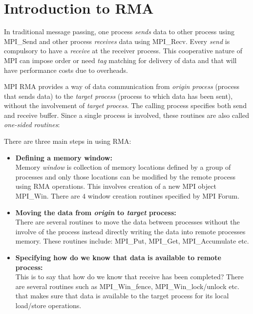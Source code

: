 \section{Introduction to RMA}
In traditional message passing, one process \textit{sends} data to other process using {\ttfamily MPI\_Send} and other 
process \textit{receives} data using {\ttfamily MPI\_Recv}. Every \textit{send} is compulsory to have a \textit{receive}
at the receiver process. This cooperative nature of MPI can impose order or need \textit{tag} matching for delivery of data
and that will have performance costs due to overheads.

MPI RMA provides a way of data communication from \textit{origin process} (process that sends data) to the \textit{target
process} (process to which data has been sent), without the involvement of \textit{target process}. The calling process specifies
both send and receive buffer. Since a single process is involved, these routines are also called \textit{one-sided routines}:

There are three main steps in using RMA:
\begin{itemize}
    \item \textbf{Defining a memory window:}\\
    Memory \textit{window} is collection of memory locations defined by a group of processes and only those locations can be
    modified by the remote process using RMA operations. This involves creation of a new MPI object {\ttfamily MPI\_Win}. There
    are $4$ window creation routines specified by MPI Forum.
    \item \textbf{Moving the data from \textit{origin} to \textit{target} process:}\\
    There are several routines to move the data between processes without the involve of the process instead directly writing the
    data into remote processes memory. These routines include: {\ttfamily MPI\_Put, MPI\_Get, MPI\_Accumulate} etc.
    \item \textbf{Specifying how do we know that data is available to remote process:}\\
    This is to say that how do we know that receive has been completed? There are several routines such as {\ttfamily MPI\_Win\_fence,
    MPI\_Win\_lock/unlock} etc. that makes sure that data is available to the target process for its local load/store operations.     
\end{itemize}

